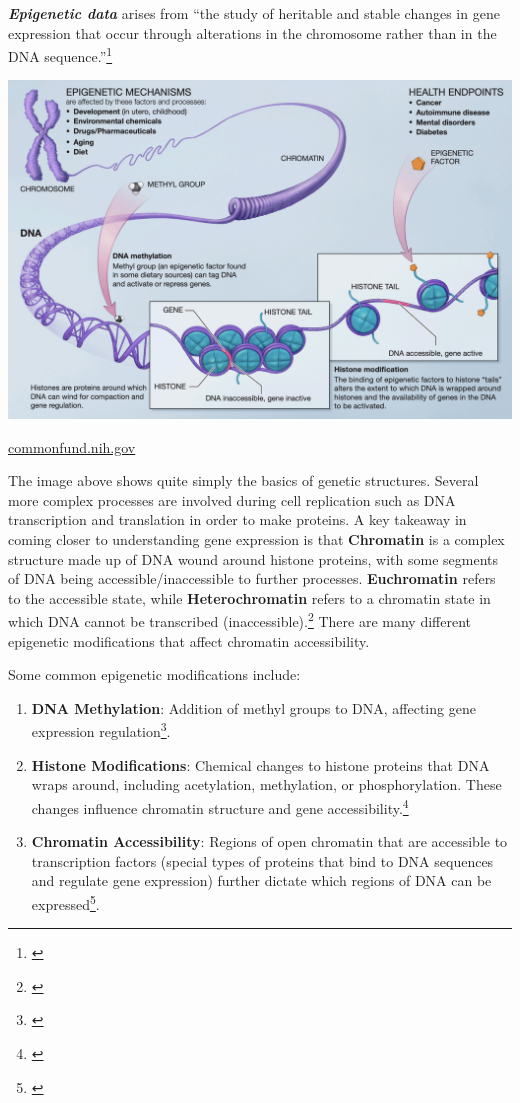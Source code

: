 \documentclass[
]{book}
\providecommand{\tightlist}{%
  \setlength{\itemsep}{0pt}\setlength{\parskip}{0pt}}
\begin{document}
\textbf{\emph{Epigenetic data}} arises from ``the study of heritable and stable changes in gene expression that occur through alterations in the chromosome rather than in the DNA sequence.''\footnote{\citet{nora2023}}

\includegraphics{images/Epigenetic_Mechanisms.png}

\href{https://commonfund.nih.gov/sites/default/files/epigeneticmechanisms.pdf}{commonfund.nih.gov}

The image above shows quite simply the basics of genetic structures. Several more complex processes are involved during cell replication such as DNA transcription and translation in order to make proteins. A key takeaway in coming closer to understanding gene expression is that \textbf{Chromatin} is a complex structure made up of DNA wound around histone proteins, with some segments of DNA being accessible/inaccessible to further processes. \textbf{Euchromatin} refers to the accessible state, while \textbf{Heterochromatin} refers to a chromatin state in which DNA cannot be transcribed (inaccessible).\footnote{\citet{shahid2023}} There are many different epigenetic modifications that affect chromatin accessibility.

Some common epigenetic modifications include:

\begin{enumerate}
\def\labelenumi{\arabic{enumi}.}
\tightlist
\item
  \textbf{DNA Methylation}: Addition of methyl groups to DNA, affecting gene expression regulation\footnote{\citet{nora2023}}.
\item
  \textbf{Histone Modifications}: Chemical changes to histone proteins that DNA wraps around, including acetylation, methylation, or phosphorylation. These changes influence chromatin structure and gene accessibility.\footnote{\citet{Kouzarides2007}}
\item
  \textbf{Chromatin Accessibility}: Regions of open chromatin that are accessible to transcription factors (special types of proteins that bind to DNA sequences and regulate gene expression) further dictate which regions of DNA can be expressed\footnote{\citet{melanie2021}}.
\end{enumerate}
\end{document}
